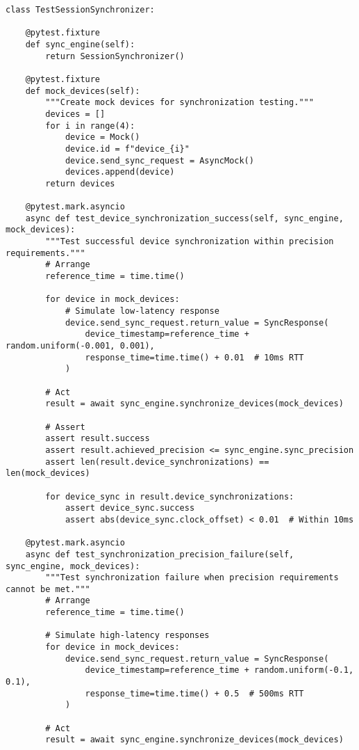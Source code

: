\documentclass[12pt,a4paper]{article}
\begin{document}
\begin{verbatim}
class TestSessionSynchronizer:
    
    @pytest.fixture
    def sync_engine(self):
        return SessionSynchronizer()
    
    @pytest.fixture
    def mock_devices(self):
        """Create mock devices for synchronization testing."""
        devices = []
        for i in range(4):
            device = Mock()
            device.id = f"device_{i}"
            device.send_sync_request = AsyncMock()
            devices.append(device)
        return devices
    
    @pytest.mark.asyncio
    async def test_device_synchronization_success(self, sync_engine, mock_devices):
        """Test successful device synchronization within precision requirements."""
        # Arrange
        reference_time = time.time()
        
        for device in mock_devices:
            # Simulate low-latency response
            device.send_sync_request.return_value = SyncResponse(
                device_timestamp=reference_time + random.uniform(-0.001, 0.001),
                response_time=time.time() + 0.01  # 10ms RTT
            )
        
        # Act
        result = await sync_engine.synchronize_devices(mock_devices)
        
        # Assert
        assert result.success
        assert result.achieved_precision <= sync_engine.sync_precision
        assert len(result.device_synchronizations) == len(mock_devices)
        
        for device_sync in result.device_synchronizations:
            assert device_sync.success
            assert abs(device_sync.clock_offset) < 0.01  # Within 10ms
    
    @pytest.mark.asyncio
    async def test_synchronization_precision_failure(self, sync_engine, mock_devices):
        """Test synchronization failure when precision requirements cannot be met."""
        # Arrange
        reference_time = time.time()
        
        # Simulate high-latency responses
        for device in mock_devices:
            device.send_sync_request.return_value = SyncResponse(
                device_timestamp=reference_time + random.uniform(-0.1, 0.1),
                response_time=time.time() + 0.5  # 500ms RTT
            )
        
        # Act
        result = await sync_engine.synchronize_devices(mock_devices)
        

\end{verbatim}
\end{document}
